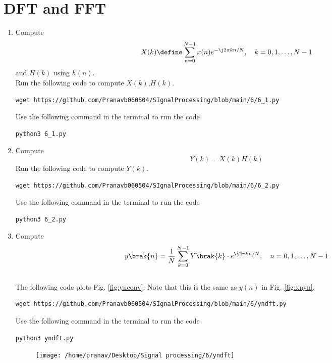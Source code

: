 \documentclass[journal,12pt,twocolumn]{IEEEtran}
\renewcommand\thesection{\arabic{section}}
\begin{document}
\section{DFT and FFT}
\begin{enumerate}[label=\thesection.\arabic*]
\item
Compute
\begin{equation}
X(k) \define \sum _{n=0}^{N-1}x(n) e^{-\j2\pi kn/N}, \quad k = 0,1,\dots, N-1
\end{equation}
\label{eq:eq6.2}
and $H(k)$ using $h(n)$.\\
\solution Run the following code to compute $X(k)$,$H(k)$.
\begin{lstlisting}
wget https://github.com/Pranavb060504/SIgnalProcessing/blob/main/6/6_1.py
\end{lstlisting}
Use the following command in the terminal to run the code
\begin{lstlisting}
python3 6_1.py
\end{lstlisting}
\item Compute 
\begin{equation}
Y(k) = X(k)H(k)
\end{equation}
\solution Run the following code to compute $Y(k)$.
\begin{lstlisting}
wget https://github.com/Pranavb060504/SIgnalProcessing/blob/main/6/6_2.py
\end{lstlisting}
Use the following command in the terminal to run the code
\begin{lstlisting}
python3 6_2.py
\end{lstlisting}
\item Compute
\begin{equation}
 y\brak{n}={\frac {1}{N}}\sum _{k=0}^{N-1}Y\brak{k}\cdot e^{\j 2\pi kn/N},\quad n = 0,1,\dots, N-1
\end{equation}
\\
\solution The following code plots Fig. \ref{fig:ynconv}. Note that this is the same as 
$y(n)$ in  Fig. 
\ref{fig:xnyn}. 
%
\begin{lstlisting}
wget https://github.com/Pranavb060504/SIgnalProcessing/blob/main/6/yndft.py
\end{lstlisting}
Use the following command in the terminal to run the code
\begin{lstlisting}
python3 yndft.py
\end{lstlisting}
\begin{figure}[!ht]
\centering
\texttt{[image: /home/pranav/Desktop/Signal processing/6/yndft]}

\end{figure}
\end{enumerate}
\end{document}
